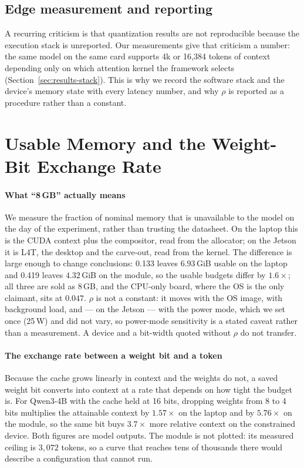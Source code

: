 \documentclass[10pt,journal]{IEEEtran}
\newcommand{\rhoSym}{\rho}
\begin{document}
\subsection{Edge measurement and reporting}
A recurring criticism is that quantization results are not reproducible because
the execution stack is unreported. Our measurements give that criticism a
number: the same model on the same card supports 4k or 16{,}384 tokens of
context depending only on which attention kernel the framework selects
(Section~\ref{sec:results-stack}). This is why we record the software stack and
the device's memory state with every latency number, and why $\rhoSym$ is reported
as a procedure rather than a constant.

\section{Usable Memory and the Weight-Bit Exchange Rate}
\label{sec:rho}

\paragraph*{What ``8\,GB'' actually means}
We measure the fraction of nominal memory that is unavailable to the model on
the day of the experiment, rather than trusting the datasheet. On the laptop this
is the CUDA context plus the compositor, read from the allocator; on the Jetson it
is L4T, the desktop and the carve-out, read from the kernel. The difference is
large enough to change conclusions: 0.133 leaves $6.93$\,GiB usable on the laptop
and 0.419 leaves $4.32$\,GiB on the module, so the usable budgets differ by
$1.6\times$; all three are sold as
8\,GB, and the CPU-only board, where the OS is the only claimant, sits at $0.047$. $\rhoSym$ is not a constant: it moves with the OS image, with background
load, and --- on the Jetson --- with the power mode, which we set once (25\,W) and
did not vary, so power-mode sensitivity is a stated caveat rather than a
measurement. A device and a bit-width quoted without $\rhoSym$ do not transfer.

\paragraph*{The exchange rate between a weight bit and a token}
Because the cache grows linearly in context and the weights do not, a saved
weight bit converts into context at a rate that depends on how tight the budget
is. For Qwen3-4B with the cache held at 16 bits, dropping weights from 8 to 4
bits multiplies the attainable context by $1.57\times$ on the laptop and by
$5.76\times$ on the module, so the same bit buys $3.7\times$ more relative
context on the constrained device. Both figures are model outputs. The module is
not plotted: its measured ceiling is $3{,}072$ tokens, so a curve that reaches
tens of thousands there would describe a configuration that cannot run.
\end{document}
